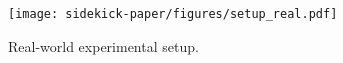 \begin{figure}[t]
\centering
\texttt{[image: sidekick-paper/figures/setup\_real.pdf]}
\caption{Real-world experimental setup.
\vspace{-0.4cm}
}
\label{fig:setup:real}
\end{figure}
